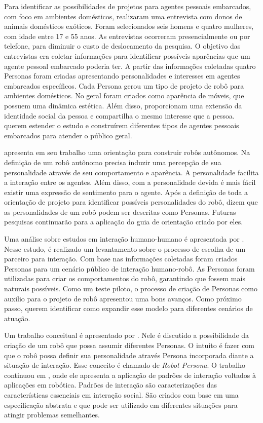 Para identificar as possibilidades de projetos para agentes pessoais embarcados, com foco em ambientes domésticos, \textcite{ljungblad:2006} realizaram uma entrevista com donos de animais domésticos exóticos. Foram selecionados seis homens e quatro mulheres, com idade entre 17 e 55 anos. As entrevistas ocorreram presencialmente ou por telefone, para diminuir o custo de deslocamento da pesquisa. O objetivo das entrevistas era coletar informações para identificar possíveis aparências que um agente pessoal embarcado poderia ter. A partir das informações coletadas quatro Personas foram criadas apresentando personalidades e interesses em agentes embarcados específicos. Cada Persona gerou um tipo de projeto de robô para ambientes domésticos. No geral foram criados como aparência de móveis, que possuem uma dinâmica estética. Além disso, proporcionam uma extensão da identidade social da pessoa e compartilha o mesmo interesse que a pessoa. \textcite{ljungblad:2006} querem estender o estudo e construírem diferentes tipos de agentes pessoais embarcados para atender o público geral.

\textcite{meerbeek:2009} apresenta em seu trabalho uma orientação para construir robôs autônomos. Na definição de \textcite{meerbeek:2009} um robô autônomo precisa induzir uma percepção de sua personalidade através de seu comportamento e aparência. A personalidade facilita a interação entre os agentes. Além disso, com a personalidade devida é mais fácil existir uma expressão de sentimento para o agente. Após a definição de toda a orientação de projeto para identificar possíveis personalidades do robô, \textcite{meerbeek:2009} dizem que as personalidades de um robô podem ser descritas como Personas. Futuras pesquisas continuarão para a aplicação do guia de orientação criado por eles.

Uma análise sobre estudos em interação humano-humano é apresentada por \textcite{zlotowski:2011}. Nesse estudo, é realizado um levantamento sobre o processo de escolha de um parceiro para interação. Com base nas informações coletadas foram criados Personas para um cenário público de interação humano-robô. As Personas foram utilizadas para criar os comportamentos do robô, garantindo que fossem mais naturais possíveis. Como um teste piloto, o processo de criação de Personas como auxilio para o projeto de robô apresentou uma bons avanços. Como próximo passo, \textcite{zlotowski:2011} querem identificar como expandir esse modelo para diferentes cenários de atuação.

Um trabalho conceitual é apresentado por \textcite{ruckert:2011}. Nele é discutido a possibilidade da criação de um robô que possa assumir diferentes Personas. O intuito é fazer com que o robô possa definir sua personalidade através Persona incorporada diante a situação de interação. Esse conceito é chamado de \emph{Robot Persona}. O trabalho continuou em \textcite{ruckert:2013}, onde ele apresenta a aplicação de padrões de interação voltados à aplicações em robótica. Padrões de interação são caracterizações das características essenciais em interação social. São criados com base em uma especificação abstrata e que pode ser utilizado em diferentes situações para atingir problemas semelhantes.

